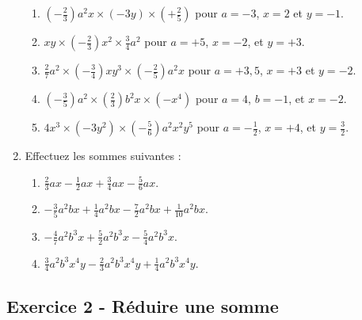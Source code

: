 \documentclass[12 pt]{extarticle}
\theoremstyle{plain}
\begin{document}
\begin{enumerate}
\begin{enumerate}
\item $\left(-\frac23\right) a^2x \times (-3y) \times \left(+\frac25\right)$ pour $a=-3$, $x=2$ et $y=-1$. 
\item $xy \times \left(-\frac23\right)x^2\times \frac34a^2$ pour $a=+5$, $x=-2$, et $y=+3$.
\item $\frac27a^2\times\left(-\frac34\right)xy^3\times \left(-\frac25\right)a^2x$ pour $a=+3,5$, $x=+3$ et $y=-2$. 
\item $\left(-\frac35\right)a^2 \times \left(\frac23\right)b^2x \times (-x^4)$ pour $a=4$, $b=-1$, et $x=-2$. 
\item $4x^3 \times (-3y^2) \times \left(-\frac56\right) a^2x^2y^5$ pour $a=-\frac12$, $x=+4$, et $y=\frac32$. 
\end{enumerate}
\item Effectuez les sommes suivantes : 
\begin{enumerate}
\item $\frac23ax-\frac12ax+\frac34ax-\frac56ax$.
\item $-\frac35a^2bx+\frac14a^2bx-\frac72a^2bx+\frac1{10}a^2bx$.
\item $-\frac47a^2b^3x+\frac52a^2b^3x-\frac54a^2b^3x$.
\item $\frac34a^2b^3x^4y-\frac23a^2b^3x^4y+\frac14a^2b^3x^4y$. 
\end{enumerate}
\end{enumerate}


\subsection*{Exercice 2 - Réduire une somme}
\end{document}
